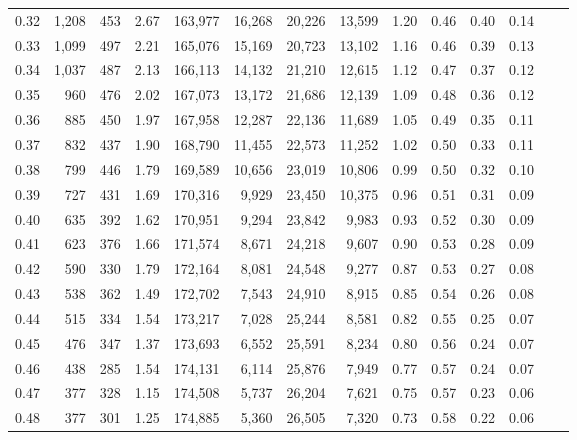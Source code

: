 \begin{tabular}{rrrrrrrrrrrrrr}
0.32 &   1,208 &  453 &    2.67 &  163,977 &   16,268 &  20,226 &  13,599 &  1.20 &  0.46 &  0.40 &      0.14 \\
0.33 &   1,099 &  497 &    2.21 &  165,076 &   15,169 &  20,723 &  13,102 &  1.16 &  0.46 &  0.39 &      0.13 \\
0.34 &   1,037 &  487 &    2.13 &  166,113 &   14,132 &  21,210 &  12,615 &  1.12 &  0.47 &  0.37 &      0.12 \\
0.35 &     960 &  476 &    2.02 &  167,073 &   13,172 &  21,686 &  12,139 &  1.09 &  0.48 &  0.36 &      0.12 \\
0.36 &     885 &  450 &    1.97 &  167,958 &   12,287 &  22,136 &  11,689 &  1.05 &  0.49 &  0.35 &      0.11 \\
0.37 &     832 &  437 &    1.90 &  168,790 &   11,455 &  22,573 &  11,252 &  1.02 &  0.50 &  0.33 &      0.11 \\
0.38 &     799 &  446 &    1.79 &  169,589 &   10,656 &  23,019 &  10,806 &  0.99 &  0.50 &  0.32 &      0.10 \\
0.39 &     727 &  431 &    1.69 &  170,316 &    9,929 &  23,450 &  10,375 &  0.96 &  0.51 &  0.31 &      0.09 \\
0.40 &     635 &  392 &    1.62 &  170,951 &    9,294 &  23,842 &   9,983 &  0.93 &  0.52 &  0.30 &      0.09 \\
0.41 &     623 &  376 &    1.66 &  171,574 &    8,671 &  24,218 &   9,607 &  0.90 &  0.53 &  0.28 &      0.09 \\
0.42 &     590 &  330 &    1.79 &  172,164 &    8,081 &  24,548 &   9,277 &  0.87 &  0.53 &  0.27 &      0.08 \\
0.43 &     538 &  362 &    1.49 &  172,702 &    7,543 &  24,910 &   8,915 &  0.85 &  0.54 &  0.26 &      0.08 \\
0.44 &     515 &  334 &    1.54 &  173,217 &    7,028 &  25,244 &   8,581 &  0.82 &  0.55 &  0.25 &      0.07 \\
0.45 &     476 &  347 &    1.37 &  173,693 &    6,552 &  25,591 &   8,234 &  0.80 &  0.56 &  0.24 &      0.07 \\
0.46 &     438 &  285 &    1.54 &  174,131 &    6,114 &  25,876 &   7,949 &  0.77 &  0.57 &  0.24 &      0.07 \\
0.47 &     377 &  328 &    1.15 &  174,508 &    5,737 &  26,204 &   7,621 &  0.75 &  0.57 &  0.23 &      0.06 \\
0.48 &     377 &  301 &    1.25 &  174,885 &    5,360 &  26,505 &   7,320 &  0.73 &  0.58 &  0.22 &      0.06 \\

\end{tabular}
